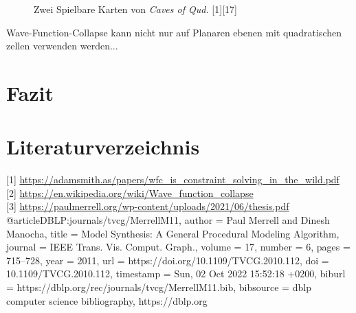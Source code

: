\documentclass[12pt]{report}
\begin{document}
\begin{figure}[H]
    \centering
    \caption{Zwei Spielbare Karten von \textit{Caves of Qud.} {[1][17]}}%
\end{figure}

Wave-Function-Collapse kann nicht nur auf Planaren ebenen mit quadratischen zellen verwenden werden...

{\let\clearpage\relax\chapter{Fazit}}

{\let\clearpage\relax\chapter{Literaturverzeichnis}}
{[1]} \url{https://adamsmith.as/papers/wfc_is_constraint_solving_in_the_wild.pdf}\\
{[2]} \url{https://en.wikipedia.org/wiki/Wave_function_collapse}\\
{[3]} \url{https://paulmerrell.org/wp-content/uploads/2021/06/thesis.pdf}\\

@article{DBLP:journals/tvcg/MerrellM11,
  author       = {Paul Merrell and
                  Dinesh Manocha},
  title        = {Model Synthesis: {A} General Procedural Modeling Algorithm},
  journal      = {{IEEE} Trans. Vis. Comput. Graph.},
  volume       = {17},
  number       = {6},
  pages        = {715--728},
  year         = {2011},
  url          = {https://doi.org/10.1109/TVCG.2010.112},
  doi          = {10.1109/TVCG.2010.112},
  timestamp    = {Sun, 02 Oct 2022 15:52:18 +0200},
  biburl       = {https://dblp.org/rec/journals/tvcg/MerrellM11.bib},
  bibsource    = {dblp computer science bibliography, https://dblp.org}
}
\end{document}
